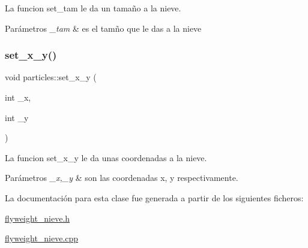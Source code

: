 La funcion set\+\_\+tam le da un tamaño a la nieve. 
\begin{DoxyParams}{Parámetros}
{\em \+\_\+tam} & es el tamño que le das a la nieve \\
\hline
\end{DoxyParams}
\mbox{\label{classparticles_aed9719fe5f8de507f97c154b220307c6}} 
\subsubsection{\texorpdfstring{set\+\_\+x\+\_\+y()}{set\_x\_y()}}
{\footnotesize\ttfamily void particles\+::set\+\_\+x\+\_\+y (\begin{DoxyParamCaption}\item[{int}]{\+\_\+x,  }\item[{int}]{\+\_\+y }\end{DoxyParamCaption})}

La funcion set\+\_\+x\+\_\+y le da unas coordenadas a la nieve. 
\begin{DoxyParams}{Parámetros}
{\em \+\_\+x,\+\_\+y} & son las coordenadas x, y respectivamente. \\
\hline
\end{DoxyParams}


La documentación para esta clase fue generada a partir de los siguientes ficheros\+:\begin{DoxyCompactItemize}
\item 
\hyperlink{flyweight__nieve_8h}{flyweight\+\_\+nieve.\+h}\item 
\hyperlink{flyweight__nieve_8cpp}{flyweight\+\_\+nieve.\+cpp}\end{DoxyCompactItemize}
